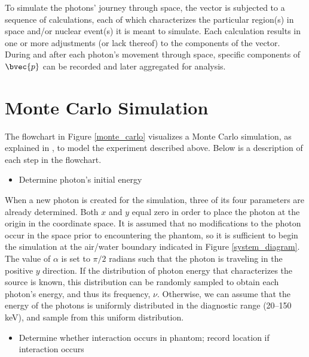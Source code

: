 \documentclass[12pt]{article} %
\begin{document}
To simulate the photons' journey through space, the vector is subjected to
a sequence of calculations, each of which characterizes the particular
region(s) in space and/or nuclear event(s) it is meant to simulate. Each calculation results in one or more adjustments (or lack thereof) to the components of the vector. During and after each photon's movement through space, specific components of $\bvec{p}$ can be recorded and later aggregated for analysis.

\section*{Monte Carlo Simulation}
The flowchart in Figure \ref{monte_carlo} visualizes a Monte Carlo simulation, as explained in \cite[p.~635--7]{barrett1981}, to model the experiment described above. Below is a description of each step in the flowchart. 

\begin{itemize}
\item Determine photon's initial energy
\end{itemize}

When a new photon is created for the simulation, three of its four parameters are already determined. Both $x$ and $y$ equal zero in order to place the photon at the origin in the coordinate space. It is assumed that no modifications to the photon occur in the space prior to encountering the phantom, so it is sufficient to begin the simulation at the air/water boundary indicated in Figure \ref{system_diagram}. The value of $\alpha$ is set to $\pi/2$ radians such that the photon is traveling in the positive $y$ direction. If the distribution of photon energy that characterizes the source is known, this distribution can be randomly sampled to obtain each photon's energy, and thus its frequency, $\nu$. Otherwise, we can assume that the energy of the photons is uniformly distributed in the diagnostic range (20--150 keV), and sample from this uniform distribution.

\begin{itemize}
\item Determine whether interaction occurs in phantom; record location if interaction occurs
\end{itemize}
\end{document}
